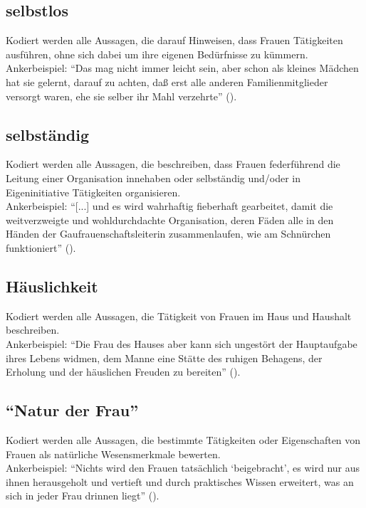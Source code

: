 \documentclass[12pt, titlepage=true, toc=bib]{scrartcl}
\begin{document}
\subsection*{selbstlos}

Kodiert werden alle Aussagen, die darauf Hinweisen, dass Frauen Tätigkeiten ausführen, ohne sich dabei um ihre eigenen Bedürfnisse zu kümmern.\\
Ankerbeispiel: "`Das mag nicht immer leicht sein, aber schon als kleines Mädchen hat sie gelernt, darauf zu achten, daß erst alle anderen Familienmitglieder versorgt waren, ehe sie selber ihr Mahl verzehrte"' (\cite[5]{friewart_japanisches_1941}).

\subsection*{selbständig}

Kodiert werden alle Aussagen, die beschreiben, dass Frauen federführend die Leitung einer Organisation innehaben oder selbständig und/oder in Eigeninitiative Tätigkeiten organisieren.\\
Ankerbeispiel: "`[...] und es wird wahrhaftig fieberhaft gearbeitet, damit die weitverzweigte und wohldurchdachte Organisation, deren Fäden alle in den Händen der Gaufrauenschaftsleiterin zusammenlaufen, wie am Schnürchen funktioniert"' (\cite[778]{a._v._s._kameradschaft_1936}).

\subsection*{Häuslichkeit}

Kodiert werden alle Aussagen, die Tätigkeit von Frauen im Haus und Haushalt beschreiben.\\
Ankerbeispiel: "`Die Frau des Hauses aber kann sich ungestört der Hauptaufgabe ihres Lebens widmen, dem Manne eine Stätte des ruhigen Behagens, der Erholung und der häuslichen Freuden zu bereiten"' (\cite[5]{friewart_japanisches_1941}).

\subsection*{"`Natur der Frau"'}

Kodiert werden alle Aussagen, die bestimmte Tätigkeiten oder Eigenschaften von Frauen als natürliche Wesensmerkmale bewerten.\\
Ankerbeispiel: \enquote{Nichts wird den Frauen tatsächlich \enquote{beigebracht}, es wird nur aus ihnen herausgeholt und vertieft und durch praktisches Wissen erweitert, was an sich in jeder Frau drinnen liegt} (\cite[775]{a._v._s._kameradschaft_1936}).
\end{document}
